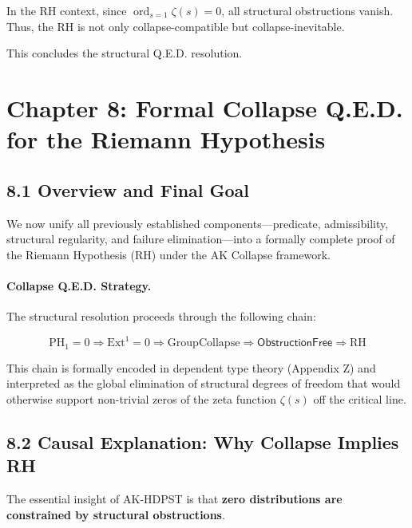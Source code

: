 \documentclass[11pt]{article}
\begin{document}
In the RH context, since \( \operatorname{ord}_{s=1} \zeta(s) = 0 \), all structural obstructions vanish. Thus, the RH is not only collapse-compatible but collapse-inevitable.

This concludes the structural Q.E.D. resolution.



\section*{Chapter 8: Formal Collapse Q.E.D. for the Riemann Hypothesis}

\subsection*{8.1 Overview and Final Goal}

We now unify all previously established components—predicate, admissibility, structural regularity, and failure elimination—into a formally complete proof of the Riemann Hypothesis (RH) under the AK Collapse framework.

\paragraph{Collapse Q.E.D. Strategy.}

The structural resolution proceeds through the following chain:

\[
\boxed{
\mathrm{PH}_1 = 0
\Rightarrow
\mathrm{Ext}^1 = 0
\Rightarrow
\mathrm{GroupCollapse}
\Rightarrow
\mathsf{ObstructionFree}
\Rightarrow
\mathrm{RH}
}
\]

\noindent
This chain is formally encoded in dependent type theory (Appendix Z) and interpreted as the global elimination of structural degrees of freedom that would otherwise support non-trivial zeros of the zeta function \( \zeta(s) \) off the critical line.

\subsection*{8.2 Causal Explanation: Why Collapse Implies RH}

The essential insight of AK-HDPST is that \textbf{zero distributions are constrained by structural obstructions}.
\end{document}
